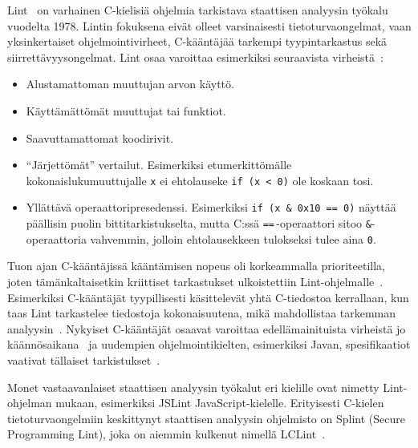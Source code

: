 
Lint~\cite{Lint} on varhainen C-kielisiä ohjelmia tarkistava staattisen analyysin työkalu vuodelta 1978.
Lintin fokuksena eivät olleet varsinaisesti tietoturvaongelmat,
vaan yksinkertaiset ohjelmointivirheet, C-kääntäjää tarkempi tyypintarkastus sekä siirrettävyysongelmat.
Lint osaa varoittaa esimerkiksi seuraavista virheistä~\cite{Lint}:

\begin{itemize}
    \item Alustamattoman muuttujan arvon käyttö.
    \item Käyttämättömät muuttujat tai funktiot.
    \item Saavuttamattomat koodirivit.
    \item ``Järjettömät'' vertailut.
           Esimerkiksi etumerkittömälle kokonaislukumuuttujalle \texttt{x} ei ehtolauseke
           \texttt{if (x < 0)} ole koskaan tosi.
   \item Yllättävä operaattoripresedenssi.
         Esimerkiksi \texttt{if (x \& 0x10 == 0)} näyttää päällisin puolin bittitarkistukselta,
         mutta C:ssä \texttt{==}\,-operaattori sitoo \texttt{\&}-operaattoria vahvemmin,
         jolloin ehtolausekkeen tulokseksi tulee aina \texttt{0}.
\end{itemize}

Tuon ajan C-kääntäjissä kääntämisen nopeus oli korkeammalla prioriteetilla,
joten tämänkaltaisetkin kriittiset tarkastukset ulkoistettiin Lint-ohjelmalle~\cite{Lint}.
Esimerkiksi C-kääntäjät tyypillisesti käsittelevät yhtä C-tiedostoa kerrallaan,
kun taas Lint tarkastelee tiedostoja kokonaisuutena,
mikä mahdollistaa tarkemman analyysin~\cite{Lint}.
Nykyiset C-kääntäjät osaavat varoittaa e\-del\-lä\-mai\-ni\-tuis\-ta virheistä
jo käännösaikana~\cite{SecurityRootOfTheProblem} ja uudempien ohjelmointikielten,
esimerkiksi Javan, spesifikaatiot vaativat tällaiset tarkistukset~\cite[22.3]{Sommerville}.

Monet vastaavanlaiset staattisen analyysin työkalut eri kielille ovat nimetty
Lint-ohjelman mukaan, esimerkiksi JSLint JavaScript-kielelle.
Erityisesti C-kielen tietoturvaongelmiin keskittynyt staattisen analyysin ohjelmisto on Splint
(Secure Programming Lint), joka on aiemmin kulkenut nimellä LCLint~\cite{SplintLCLint}.

